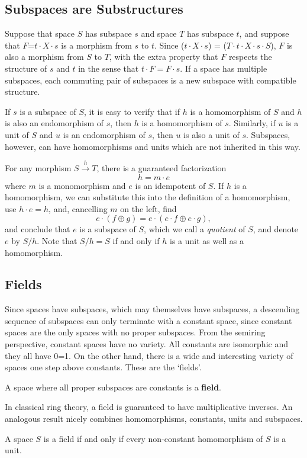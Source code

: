 \documentclass[11pt]{article}
\begin{document}
\subsection{Subspaces are Substructures} 

Suppose that space $S$ has subspace $s$ and space $T$ has subspace $t$, and suppose that $F$=$t\cdot X\cdot s$ is a morphism from $s$ to $t$.   
Since ($t\cdot X\cdot s$) = ($T\cdot t \cdot X\cdot s\cdot S$), 
$F$ is also a morphism from $S$ to $T$, with the extra property that $F$ respects the structure of $s$ and $t$ in the sense that $t\cdot F=F\cdot s$.  
If a space has multiple subspaces, each commuting pair of subspaces is a new subspace with compatible structure.  

     If $s$ is a subspace of $S$, it is easy to verify that if $h$ is a homomorphism of $S$ and $h$ is also an endomorphism of $s$, then $h$ is 
a homomorphism of $s$.  Similarly, if $u$ is a unit of $S$ and $u$ is an endomorphism of $s$, then $u$ is also a unit of $s$.  Subspaces, however, 
can have homomorphisms and units which are not inherited in this way.

       For any morphism $S{\overset h \longrightarrow}T$, there is a guaranteed factorization  
\begin{equation}
h = m \cdot e
\end{equation}
where $m$ is a monomorphism and $e$ is an idempotent of $S$.  If $h$ is a homomorphism, we can substitute this into the 
definition of a homomorphism, use $h\cdot e=h$, and, cancelling $m$ on the left, find 
\begin{equation}
e\cdot (f\oplus g) = e\cdot (e\cdot f \oplus e\cdot g),
\end{equation}
and conclude that $e$ is a subspace of $S$, which we call a {\it quotient} of $S$, and denote $e$ by $S/h$.  Note that $S/h=S$ if and only if $h$ is a unit as well as a homomorphism. 

\subsection{Fields}

Since spaces have subspaces, which may themselves have subspaces, a descending sequence of subspaces can only terminate 
with a constant space, since constant spaces are the only spaces with no proper subspaces.  From the semiring perspective, 
constant spaces have no variety.  All constants are isomorphic and they all have 0=1.  On the other hand, there is a wide and 
interesting variety of spaces one step above constants.  These are the `fields'.  
\begin{definition}
A space where all proper subspaces are constants is a {\bf field}.
\end{definition}
\noindent In classical ring theory, a field is guaranteed to have 
multiplicative inverses.  An analogous result nicely combines homomorphisms, constants, units and subspaces.  
\begin{theorem}
A space $S$ is a field if and only if every non-constant homomorphism of $S$ is a unit. 
\end{theorem}
\end{document}
